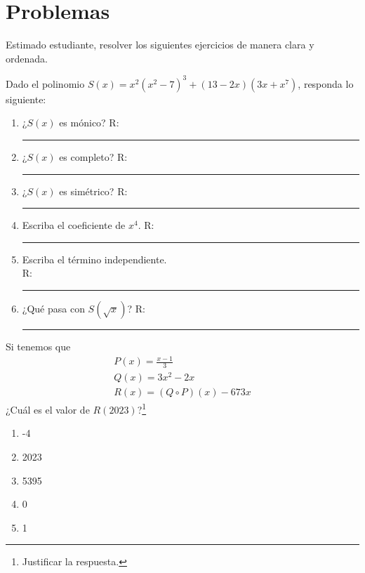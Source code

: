\section*{\large Problemas}

Estimado estudiante, resolver los siguientes ejercicios de manera clara y ordenada.

\begin{exercise}
    Dado el polinomio $S(x) = x^2(x^2 - 7)^3 + (13 - 2x)(3x + x^7)$, responda lo siguiente:
    \begin{multicols}{2}
        \begin{enumerate}
            \item ¿$S(x)$ es mónico? R: \rule{1cm}{0.1mm}
            \item ¿$S(x)$ es completo? R: \rule{1cm}{0.1mm}
            \item ¿$S(x)$ es simétrico? R: \rule{1cm}{0.1mm}
            \item Escriba el coeficiente de $x^4$. R: \rule{1cm}{0.1mm}
            \item Escriba el término independiente.\\ R: \rule{1cm}{0.1mm}
            \item ¿Qué pasa con $S(\sqrt{x})$? R: \rule{2cm}{0.1mm}
        \end{enumerate}
    \end{multicols}
\end{exercise}

\begin{exercise}
    Si tenemos que
    \begin{align*}
        P(x) = \frac{x - 1}{3} \\
        Q(x) = 3x^2 - 2x \\
        R(x) = (Q \circ P)(x) - 673x
    \end{align*}
    ¿Cuál es el valor de $R(2023)$?\footnote{Justificar la respuesta.}
    \begin{multicols}{5}
        \begin{enumerate}
            \item -4
            \item 2023
            \item 5395
            \item 0
            \item 1
        \end{enumerate}
    \end{multicols}
\end{exercise}


